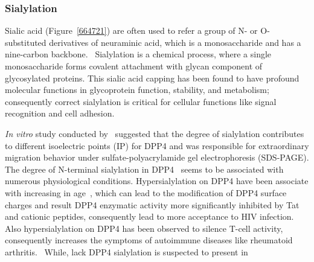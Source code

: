 \subsubsection {Sialylation}
Sialic acid (Figure~\ref{664721}) are often used to refer a group of N- or O-substituted derivatives of neuraminic acid, which is a monosaccharide and has a nine-carbon backbone.~\cite{Vocadlo_2009} Sialylation is a chemical process, where a single monosaccharide forms covalent attachment with glycan component of glycosylated proteins. This sialic acid capping has been found to have profound molecular functions in glycoprotein function, stability, and metabolism; consequently correct sialylation is critical for cellular functions like signal recognition and cell adhesion.~\cite{Bhide_2016}
\par 
\textit{In vitro} study conducted by~\citet{Schmauser1999} suggested that the degree of sialylation contributes to different isoelectric points (IP) for DPP4 and was responsible for extraordinary migration behavior under sulfate-polyacrylamide gel electrophoresis (SDS-PAGE). 
The degree of N-terminal sialylation in DPP4~\cite{Stehling_1999} seems to be associated with numerous physiological conditions. Hypersialylation on DPP4 have been associate with increasing in age~\cite{SMITH_1998}, which can lead to the modification of DPP4 surface charges and result DPP4 enzymatic activity more significantly inhibited by Tat and cationic peptides, consequently lead to more acceptance to HIV infection.~\cite{SMITH_1998} Also hypersialylation on DPP4 has been observed to silence T-cell activity, consequently increases the symptoms of autoimmune diseases like rheumatoid arthritis.~\cite{Cuchacovich2001}  
While, lack DPP4 sialylation is suspected to present in 
\cite{K_hne_1996} 
